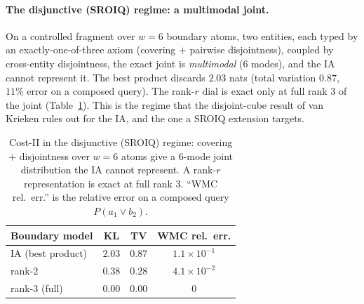 \documentclass[letterpaper]{article}
\begin{document}
\paragraph{The disjunctive (SROIQ) regime: a multimodal joint.}
On a controlled fragment over $w{=}6$ boundary atoms, two entities, each typed by
an exactly-one-of-three axiom (covering $+$ pairwise disjointness), coupled by cross-entity
disjointness, the exact joint is \emph{multimodal} ($6$ modes), and the IA cannot represent it.
The best product discards $2.03$ nats (total variation $0.87$, $11\%$ error on a composed query). The
rank-$r$ dial is exact only at full rank $3$ of the joint (Table~\ref{tab:disj}). This is the
regime that the disjoint-cube result of van Krieken rules out for the IA, and the one a SROIQ extension targets.

\begin{table}[t]\centering
\caption{Cost-II in the disjunctive (SROIQ) regime: covering $+$ disjointness over $w{=}6$ atoms give a $6$-mode joint distribution the IA cannot represent. A rank-$r$ representation is exact at full rank $3$. ``WMC rel.\ err.'' is the relative error on a composed query $P(a_1\vee b_2)$.}\label{tab:disj}
\footnotesize
\setlength{\tabcolsep}{3pt}
\begin{tabular}{@{}lccc@{}}
\toprule
Boundary model & KL & TV & WMC rel.\ err.\\
\midrule
IA (best product) & $2.03$ & $0.87$ & $1.1{\times}10^{-1}$\\
rank-$2$ & $0.38$ & $0.28$ & $4.1{\times}10^{-2}$\\
rank-$3$ (full) & $0.00$ & $0.00$ & $0$\\
\bottomrule
\end{tabular}
\end{table}

\fi
\end{document}
